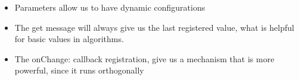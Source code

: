 \documentclass[a4paper,10pt,twoside]{book}
\begin{document}
			\begin{itemize}
				\item Parameters allow us to have dynamic configurations
				\item The get message will always give us the last registered value, what is helpful for basic values in algorithms.
				\item The onChange: callback registration, give us a mechanism that is more powerful, since it runs orthogonally 
			\end{itemize}



\ifx\wholebook\relax\else
\end{document}
